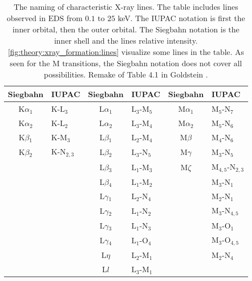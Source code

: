 \begin{table}[p]
    \centering
    \caption{
        The naming of characteristic X-ray lines.
        The table includes lines observed in EDS from $0.1$ to $25$ keV.
        The IUPAC notation is first the inner orbital, then the outer orbital.
        The Siegbahn notation is the inner shell and the lines relative intensity.
        \cref{fig:theory:xray_formation:lines} visualize some lines in the table.
        As seen for the M transitions, the Siegbahn notation does not cover all possibilities.
        Remake of Table 4.1 in Goldstein \cite{goldstein_scanning_2018}.
    }
    \label{tab:theory:naming_convention}
    \begin{tabular}{cl|cl|cl}
        \hline
        \textbf{Siegbahn} & \textbf{IUPAC} & \textbf{Siegbahn} & \textbf{IUPAC} & \textbf{Siegbahn} & \textbf{IUPAC}      \\
        \hline
        K$\alpha$$_1$     & K-L$_3$        & L$\alpha$$_1$     & L$_3$-M$_5$    & M$\alpha$$_1$     & M$_5$-N$_7$         \\
        K$\alpha$$_2$     & K-L$_2$        & L$\alpha$$_2$     & L$_3$-M$_4$    & M$\alpha$$_2$     & M$_5$-N$_6$         \\
        K$\beta$$_1$      & K-M$_3$        & L$\beta$$_1$      & L$_2$-M$_4$    & M$\beta$          & M$_4$-N$_6$         \\
        K$\beta$$_2$      & K-N$_{2,3}$    & L$\beta$$_2$      & L$_3$-N$_5$    & M$\gamma$         & M$_3$-N$_5$         \\
                          &                & L$\beta$$_3$      & L$_1$-M$_3$    & M$\zeta$          & M$_{4,5}$-N$_{2,3}$ \\
                          &                & L$\beta$$_4$      & L$_1$-M$_2$    &                   & M$_3$-N$_1$         \\
                          &                & L$\gamma$$_1$     & L$_2$-N$_4$    &                   & M$_2$-N$_1$         \\
                          &                & L$\gamma$$_2$     & L$_1$-N$_2$    &                   & M$_3$-N$_{4,5}$     \\
                          &                & L$\gamma$$_3$     & L$_1$-N$_3$    &                   & M$_3$-O$_1$         \\
                          &                & L$\gamma$$_4$     & L$_1$-O$_4$    &                   & M$_3$-O$_{4,5}$     \\
                          &                & L$\eta$           & L$_2$-M$_1$    &                   & M$_2$-N$_4$         \\
                          &                & L$l$              & L$_3$-M$_1$    &                   &                     \\
        \hline
    \end{tabular}
\end{table}